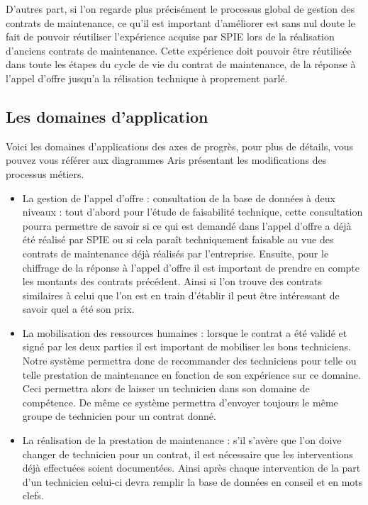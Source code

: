 D'autres part, si l'on regarde plus précisément le processus global de gestion des contrats de maintenance, ce qu'il est important d'améliorer est sans nul doute le fait de pouvoir réutiliser l'expérience acquise par SPIE lors de la réalisation d'anciens contrats de maintenance. Cette expérience doit pouvoir être réutilisée dans toute les étapes du cycle de vie du contrat de maintenance, de la réponse à l'appel d'offre jusqu'a la rélisation technique à proprement parlé.

\subsection {Les domaines d'application}
Voici les domaines d'applications des axes de progrès, pour plus de détails, vous pouvez vous référer aux diagrammes Aris présentant les modifications des processus métiers.
\begin{itemize}
\item La gestion de l'appel d'offre : consultation de la base de données à deux niveaux : tout d'abord pour l'étude de faisabilité technique, cette consultation pourra permettre de savoir si ce qui est demandé dans l'appel d'offre a déjà été réalisé par SPIE ou si cela paraît techniquement faisable au vue des contrats de maintenance déjà réalisés par l'entreprise. Ensuite, pour le chiffrage de la réponse à l'appel d'offre il est important de prendre en compte les montants des contrats précédent. Ainsi si l'on trouve des contrats similaires à celui que l'on est en train d'établir il peut être intéressant de savoir quel a été son prix.
\item La mobilisation des ressources humaines : lorsque le contrat a été validé et signé par les deux parties il est important de mobiliser les bons techniciens. Notre système permettra donc de recommander des techniciens pour telle ou telle prestation de maintenance en fonction de son expérience sur ce domaine. Ceci permettra alors de laisser un technicien dans son domaine de compétence. De même ce système permettra d'envoyer toujours le même groupe de technicien pour un contrat donné.
\item La réalisation de la prestation de maintenance : s'il s'avère que l'on doive changer de technicien pour un contrat, il est nécessaire que les interventions déjà effectuées soient documentées. Ainsi après chaque intervention de la part d'un technicien celui-ci devra remplir la base de données en conseil et en mots clefs.
\end{itemize}

